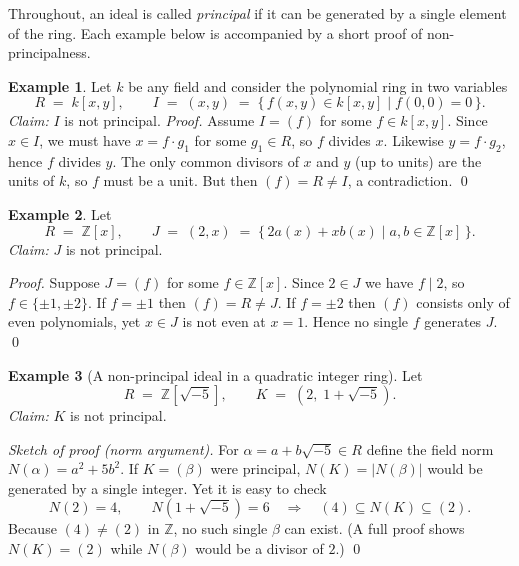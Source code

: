 \documentclass[12pt]{article}
\theoremstyle{definition} %
\newtheorem{example}{Example}
\theoremstyle{plain} %
\begin{document}
    Throughout, an ideal is called \emph{principal} if it can be generated by a single element of the ring.  
    Each example below is accompanied by a short proof of non-principalness.
    
    \bigskip
    \begin{example}
    Let $k$ be any field and consider the polynomial ring in two variables
    \[
    R \;=\; k[x,y],\qquad 
    I \;=\; (x,y)\;=\; \{\,f(x,y)\in k[x,y] \mid f(0,0)=0\,\}.
    \]
    \emph{Claim:} $I$ is not principal.
    \emph{Proof.}
    Assume $I=(f)$ for some $f\in k[x,y]$.
    Since $x\in I$, we must have $x=f\cdot g_1$ for some $g_1\in R$, so $f$ divides $x$.
    Likewise $y=f\cdot g_2$, hence $f$ divides $y$.
    The only common divisors of $x$ and $y$ (up to units) are the units of $k$, so $f$ must be a unit.
    But then $(f)=R\neq I$, a contradiction.  \qed
    \end{example}
    
    \bigskip
    \begin{example}
    Let
    \[
    R \;=\; \mathbb Z[x],\qquad
    J \;=\; (2,x)\;=\;\{\,2a(x)+x b(x)\mid a,b\in\mathbb Z[x]\,\}.
    \]
    \emph{Claim:} $J$ is not principal.
    
    \emph{Proof.}
    Suppose $J=(f)$ for some $f\in\mathbb Z[x]$.
    Since $2\in J$ we have $f\mid 2$, so $f\in\{\pm1,\pm2\}$.
    If $f=\pm1$ then $(f)=R\neq J$.
    If $f=\pm2$ then $(f)$ consists only of even polynomials, yet $x\in J$ is not even at $x=1$.
    Hence no single $f$ generates $J$. \qed
    \end{example}
    
    \bigskip
    \begin{example}[A non-principal ideal in a quadratic integer ring]
    Let
    \[
    R \;=\; \mathbb Z[\sqrt{-5}],\qquad
    K \;=\; (2,\;1+\sqrt{-5}).
    \]
    \emph{Claim:} $K$ is not principal.
    
    \emph{Sketch of proof (norm argument).}
    For $\alpha=a+b\sqrt{-5}\in R$ define the field norm $N(\alpha)=a^{2}+5b^{2}$.
    If $K=(\beta)$ were principal, $N(K)=|N(\beta)|$ would be generated by a single integer.
    Yet it is easy to check
    \[
    N(2)=4,\qquad N(1+\sqrt{-5})=6\quad\Longrightarrow\quad 
    (4) \subseteq N(K)\subseteq (2).
    \]
    Because $(4)\neq(2)$ in $\mathbb Z$, no such single $\beta$ can exist.
    (A full proof shows $N(K)=(2)$ while $N(\beta)$ would be a divisor of $2$.) \qed
    \end{example}
    
\end{document}
